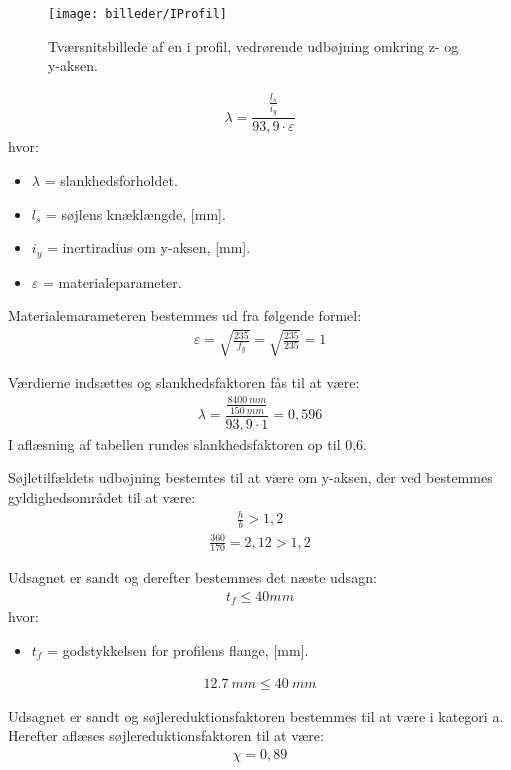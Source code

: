 \begin{figure}[H] %
\centering
\texttt{[image: billeder/IProfil]}
\caption{Tværsnitsbillede af en i profil, vedrørende udbøjning omkring z- og y-aksen. }
\label{fig:Profilyakse}
\end{figure}
\begin{align*}
\lambda = \dfrac{\frac{l_s}{i_y}}{93,9 \cdot \varepsilon}
\end{align*}
 hvor: 
 \begin{itemize}
 \item $\lambda$ = slankhedsforholdet.
 \item $l_s$ = søjlens knæklængde, [mm].
 \item $i_y$ = inertiradius om y-aksen, [mm].
 \item $\varepsilon$ = materialeparameter. 
 \end{itemize}
Materialemarameteren bestemmes ud fra følgende formel:
\begin{align*}
\varepsilon = \sqrt{\frac{235}{f_y}} = \sqrt{\frac{235}{235}} = 1
\end{align*}

Værdierne indsættes og slankhedsfaktoren fås til at være: 
\begin{align*}
\lambda =  \dfrac{\frac{8400 \SI{}{mm}}{150 \SI{}{mm}}}{93,9 \cdot 1} = 0,596
\end{align*}
I aflæsning af tabellen rundes slankhedsfaktoren op til 0,6.

Søjletilfældets udbøjning bestemtes til at være om y-aksen, der ved bestemmes gyldighedsområdet til at være: 
\begin{align*}
{\frac{h}{b}} > 1,2
\end{align*}
\begin{align*}
{\frac{360}{170}} = 2,12 > 1,2
\end{align*}

Udsagnet er sandt og derefter bestemmes det næste udsagn:
\begin{align*}
t_f \leq 40 mm
\end{align*}
hvor:
\begin{itemize}
\item $t_f$ = godstykkelsen for profilens flange, [mm].
\end{itemize}
\begin{align*}
\SI{12,7}{mm} \leq \SI{40}{mm}
\end{align*}


Udsagnet er sandt og søjlereduktionsfaktoren bestemmes til at være i kategori a. Herefter aflæses søjlereduktionsfaktoren til at være:
\begin{align*}
\chi = 0,89
\end{align*}

